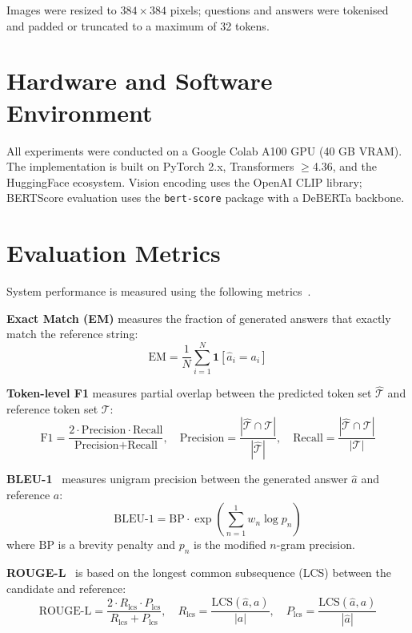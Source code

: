 \documentclass[9pt]{report}
\begin{document}
Images were resized to $384 \times 384$ pixels; questions and answers were tokenised and padded or truncated to a maximum of 32 tokens.

\section{Hardware and Software Environment}

All experiments were conducted on a Google Colab A100 GPU (40 GB VRAM). The implementation is built on PyTorch 2.x, Transformers $\geq$4.36, and the HuggingFace ecosystem. Vision encoding uses the OpenAI CLIP library; BERTScore evaluation uses the \texttt{bert-score} package with a DeBERTa backbone.

\section{Evaluation Metrics}

System performance is measured using the following metrics~\cite{bleu,rouge,meteor,cider,bertscore}.

\textbf{Exact Match (EM)} measures the fraction of generated answers that exactly match the reference string:
\begin{equation}
    \text{EM} = \frac{1}{N}\sum_{i=1}^{N} \mathbf{1}[\hat{a}_i = a_i]
\end{equation}

\textbf{Token-level F1} measures partial overlap between the predicted token set $\hat{\mathcal{T}}$ and reference token set $\mathcal{T}$:
\begin{equation}
    \text{F1} = \frac{2 \cdot \text{Precision} \cdot \text{Recall}}{\text{Precision} + \text{Recall}}, \quad \text{Precision} = \frac{|\hat{\mathcal{T}} \cap \mathcal{T}|}{|\hat{\mathcal{T}}|}, \quad \text{Recall} = \frac{|\hat{\mathcal{T}} \cap \mathcal{T}|}{|\mathcal{T}|}
\end{equation}

\textbf{BLEU-1}~\cite{bleu} measures unigram precision between the generated answer $\hat{a}$ and reference $a$:
\begin{equation}
    \text{BLEU-1} = \text{BP} \cdot \exp\!\left(\sum_{n=1}^{1} w_n \log p_n\right)
\end{equation}
where $\text{BP}$ is a brevity penalty and $p_n$ is the modified $n$-gram precision.

\textbf{ROUGE-L}~\cite{rouge} is based on the longest common subsequence (LCS) between the candidate and reference:
\begin{equation}
    \text{ROUGE-L} = \frac{2 \cdot R_{\text{lcs}} \cdot P_{\text{lcs}}}{R_{\text{lcs}} + P_{\text{lcs}}}, \quad R_{\text{lcs}} = \frac{\text{LCS}(\hat{a}, a)}{|a|}, \quad P_{\text{lcs}} = \frac{\text{LCS}(\hat{a}, a)}{|\hat{a}|}
\end{equation}
\end{document}
